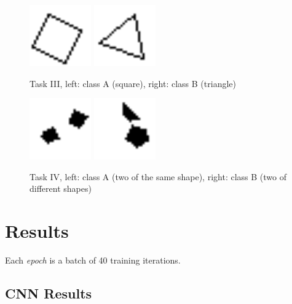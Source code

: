 \documentclass{article}
\renewcommand{\it}{\textit}
\begin{document}
\begin{figure}[ht]
  \centering
  \includegraphics[width=100px]{simpleshape-example-A.png}
  \hspace{100px}
  \includegraphics[width=100px]{simpleshape-example-B.png}
  \label{fig:simpleshape-example}
  \caption{Task III, left: class A (square), right: class B (triangle)}
\end{figure}

\begin{figure}[ht]
  \centering
  \includegraphics[width=100px]{matching-example-A.png}
  \hspace{100px}
  \includegraphics[width=100px]{matching-example-B.png}
  \label{fig:matching-example}
  \caption{Task IV, left: class A (two of the same shape), right: class B (two of different shapes)}
\end{figure}

\newpage
\restoregeometry
\pagestyle{plain}
\section{Results}

Each \it{epoch} is a batch of 40 training iterations.

\subsection{CNN Results}
\end{document}
